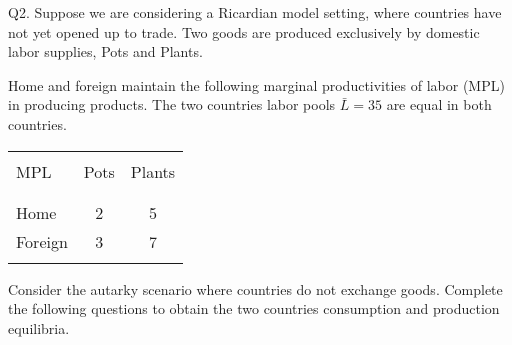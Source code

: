 \documentclass[12pt]{article}
\begin{document}
\noindent Q2. Suppose we are considering a Ricardian model setting, where countries have not yet opened up to trade.
Two goods are produced exclusively by domestic labor supplies, Pots and Plants. 

\noindent Home and foreign maintain the following marginal productivities of labor (MPL) in producing products. The two countries labor pools $\bar{L}=35$ are equal in both countries. 

\begin{table}[!h]
	\centering
	\begin{tabular}[t]{l c c }
		\hline
		&&\\
		MPL & Pots & Plants  \\
		&&\\
		\hline
		&&\\
		Home & 2 & 5  \\
		Foreign & 3 & 7 \\
		&&\\
		\hline
	\end{tabular}
\end{table}



Consider the autarky scenario where countries do not exchange goods. Complete the following questions to obtain the two countries consumption and production equilibria. 
\end{document}
